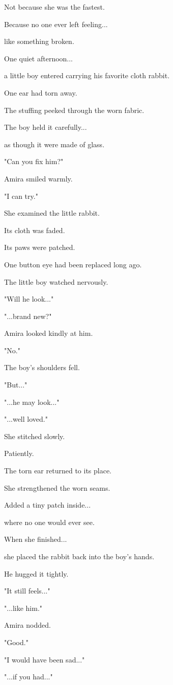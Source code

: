 \documentclass[12pt,openany]{book}
\begin{document}
Not because she was the fastest.

Because no one ever left feeling...

like something broken.

One quiet afternoon...

a little boy entered carrying his favorite cloth rabbit.

One ear had torn away.

The stuffing peeked through the worn fabric.

The boy held it carefully...

as though it were made of glass.

"Can you fix him?"

Amira smiled warmly.

"I can try."

She examined the little rabbit.

Its cloth was faded.

Its paws were patched.

One button eye had been replaced long ago.

The little boy watched nervously.

"Will he look..."

"...brand new?"

Amira looked kindly at him.

"No."

The boy's shoulders fell.

"But..."

"...he may look..."

"...well loved."

She stitched slowly.

Patiently.

The torn ear returned to its place.

She strengthened the worn seams.

Added a tiny patch inside...

where no one would ever see.

When she finished...

she placed the rabbit back into the boy's hands.

He hugged it tightly.

"It still feels..."

"...like him."

Amira nodded.

"Good."

"I would have been sad..."

"...if you had..."
\end{document}

